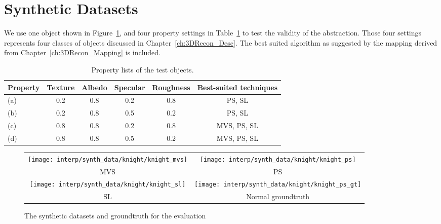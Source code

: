 \section{Synthetic Datasets}
We use one object shown in Figure~\ref{fig:synth_data}, and four property settings in Table~\ref{tab:prop_list_synth_data} to test the validity of the abstraction. Those four settings represents four classes of objects discussed in Chapter~\ref{ch:3DRecon_Desc}. The best suited algorithm as suggested by the mapping derived from Chapter~\ref{ch:3DRecon_Mapping} is included.
\begin{table}[h]
  \centering
  \begin{tabular}{l*{5}{c}}
  \hline
  \textbf{Property} & Texture & Albedo & Specular & Roughness & Best-suited techniques\\
  \hline
  (a) & 0.2 & 0.8 & 0.2 & 0.8 & PS, SL\\
  (b) & 0.2 & 0.8 & 0.5 & 0.2 & PS, SL\\
  (c) & 0.8 & 0.8 & 0.2 & 0.8 & MVS, PS, SL\\
  (d) & 0.8 & 0.8 & 0.5 & 0.2 & MVS, PS, SL\\
  \hline
  \end{tabular}
  \caption{Property lists of the test objects.}
  \label{tab:prop_list_synth_data}
\end{table}

\begin{figure}[h!]
\centering
\begin{tabular}{cc}
  \texttt{[image: interp/synth\_data/knight/knight\_mvs]}&
  \texttt{[image: interp/synth\_data/knight/knight\_ps]}\\
  MVS & PS\\
  \texttt{[image: interp/synth\_data/knight/knight\_sl]}&
  \texttt{[image: interp/synth\_data/knight/knight\_ps\_gt]}\\
  SL & Normal groundtruth\\
\end{tabular}
\caption{The synthetic datasets and groundtruth for the evaluation}
\label{fig:synth_data}
\end{figure}

